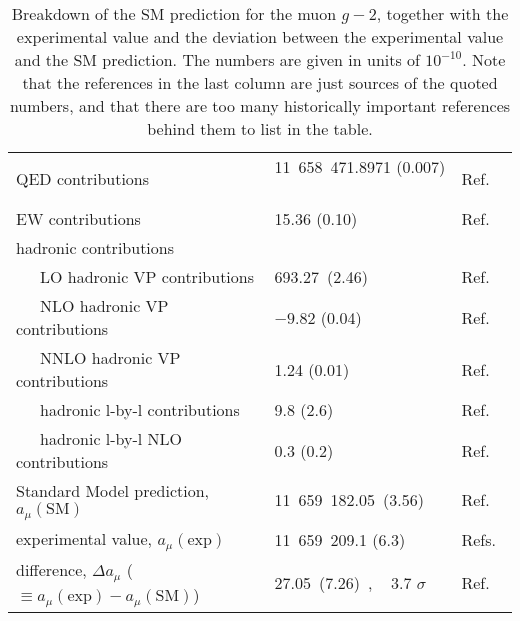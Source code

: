 \begin{table*}[thbp]
\caption{Breakdown of the SM prediction for the muon $g-2$,
together with the experimental value
and the deviation between the experimental value and 
the SM prediction.  The numbers are given in units of $10^{-10}$.
Note that the references in the last column are just sources
of the quoted numbers, and that there are too many
historically important references behind them to list in the table.}
%
\label{table:a_mu_SM}
%
\begin{center} \begin{tabular}[t]{l|ll}
\hline
  QED contributions 
 & \phantom{$-$}11~658~471.8971 (0.007)
 ~\hspace*{0.2cm}~ & Ref.~\cite{Aoyama-etal-2017} \\
  EW contributions & \phantom{$-$00~000~0}15.36 (0.10)
 & Ref.~\cite{Gnendiger-etal} \\
  hadronic contributions &  &\\
~~~LO hadronic VP contributions  &
  \phantom{$-$00~000~}693.27~(2.46) & Ref.~\cite{KNT18}\\
  ~~~NLO hadronic VP contributions &
  \phantom{00~000~00}$-9.82$ (0.04) &  Ref.~\cite{KNT18} \\
  ~~~NNLO hadronic VP contributions & 
\phantom{$-$00~000~00}1.24 (0.01)  & Ref.~\cite{Kurz-etal-hadNNLO}\\
  ~~~hadronic l-by-l contributions & 
\phantom{$-$00~000~00}9.8 (2.6) &
 Ref.~\cite{Nyffeler-LbL} \\
  ~~~hadronic l-by-l NLO contributions & 
\phantom{$-$00~000~00}0.3 (0.2) &
 Ref.~\cite{Colangelo-etal-NLOLbL} \\
\hline \hline
  Standard Model prediction, $a_\mu(\text{SM})$& 
   \phantom{$-$}11~659~182.05~(3.56)   & Ref.~\cite{KNT18} \\
  experimental value, $a_\mu(\text{exp})$
 & \phantom{$-$}11~659~209.1 (6.3) & Refs.~\cite{Bennett:2006fi,PDG} \\
\hline \hline
 difference, $\Delta a_\mu$ 
 ($\equiv a_\mu(\text{exp}) - a_\mu(\text{SM})$) & 
\phantom{$-$0~000~00}27.05~(7.26)~, ~ 3.7 $\sigma$ & Ref.~\cite{KNT18} \\
\hline
\end{tabular} \end{center} \end{table*}




